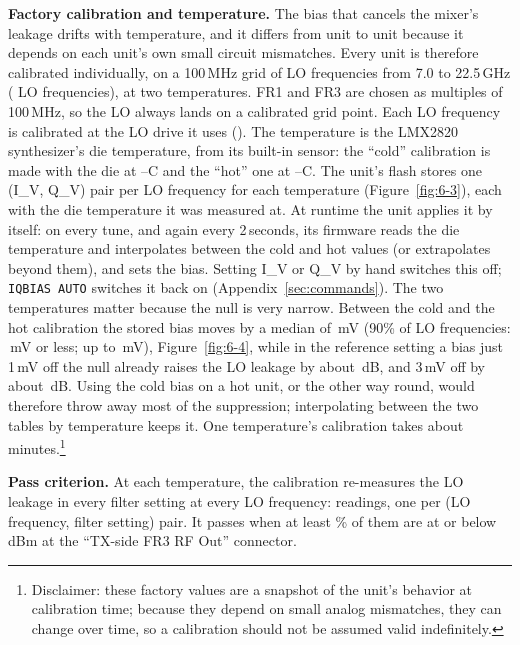 \textbf{Factory calibration and temperature.} The bias that cancels the mixer's leakage drifts with temperature, and it
differs from unit to unit because it depends on each unit's own small circuit mismatches. Every unit is therefore
calibrated individually, on a 100\,MHz grid of LO frequencies from 7.0 to 22.5\,GHz (\calLoCount{} LO frequencies), at
two temperatures. FR1 and FR3 are chosen as multiples of 100\,MHz, so the LO always lands on a calibrated grid point.
Each LO frequency is calibrated at the LO drive it uses (\lmxDriveRule). The temperature is the LMX2820 synthesizer's
die temperature, from its built-in sensor: the ``cold'' calibration is made with the die at
\calColdMinC--\calColdMaxC\textdegree C and the ``hot'' one at \calHotMinC--\calHotMaxC\textdegree C. The unit's flash
stores one (I\_V, Q\_V) pair per LO frequency for each temperature (Figure~\ref{fig:6-3}), each with the die
temperature it was measured at. At runtime the unit applies it by itself: on every tune, and again every 2\,seconds,
its firmware reads the die temperature and interpolates between the cold and hot values (or extrapolates beyond them),
and sets the bias. Setting I\_V or Q\_V by hand switches this off; \texttt{IQBIAS AUTO} switches it back on
(Appendix~\ref{sec:commands}). The two temperatures matter because the null is very narrow. Between the cold and the hot calibration the stored bias moves by a median of \tdiffMedianMv\,mV (90\% of LO frequencies: \tdiffNinetyMv\,mV or less; up to \tdiffMaxMv\,mV), Figure~\ref{fig:6-4}, while in the reference setting a bias just 1\,mV off the null already raises the LO leakage by about \nullRiseOneMv\,dB, and 3\,mV off by about \nullRiseThreeMv\,dB. Using the cold bias on a hot unit, or the other way round, would therefore throw away most of the suppression; interpolating between the two tables by temperature keeps it. One
temperature's calibration takes about \calMinutesPerTemp{} minutes.\footnote{Disclaimer: these factory values are a
snapshot of the unit's behavior at calibration time; because they depend on small analog mismatches, they can change
over time, so a calibration should not be assumed valid indefinitely.}

\textbf{Pass criterion.} At each temperature, the calibration re-measures the LO leakage in every filter setting at
every LO frequency: \calReadCount{} readings, one per (LO frequency, filter setting) pair. It passes when at least
\calPassPct\% of them are at or below \calThreshold\,dBm at the ``TX-side FR3 RF Out'' connector.

